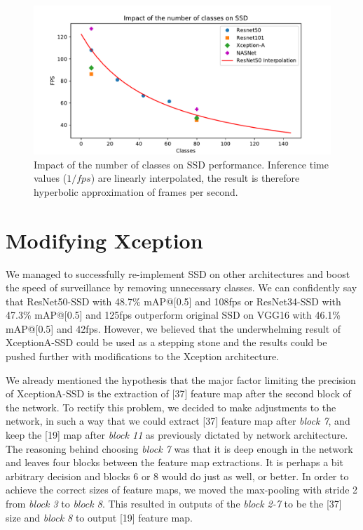 \begin{figure}
    \centering
    \includegraphics[width=\textwidth]{img/fps_cls}
    \caption[Impact of the number of classes on SSD performance]{Impact of the number of classes on SSD performance. Inference time values ($1/fps$) are linearly interpolated, the result is therefore hyperbolic approximation of frames per second.}
    \label{fig:fpscls}
\end{figure}


\section{Modifying Xception}
\label{sec:fixxception}
We managed to successfully re-implement SSD on other architectures and boost the speed of surveillance by removing unnecessary classes. We can confidently say that ResNet50-SSD with 48.7\% mAP@[0.5] and 108fps or ResNet34-SSD with 47.3\% mAP@[0.5] and 125fps outperform original SSD on VGG16 with 46.1\% mAP@[0.5] and 42fps. However, we believed that the underwhelming result of XceptionA-SSD could be used as a stepping stone and the results could be pushed further with modifications to the Xception architecture. 

We already mentioned the hypothesis that the major factor limiting the precision of XceptionA-SSD is the extraction of [37] feature map after the second block of the network. To rectify this problem, we decided to make adjustments to the network, in such a way that we could extract [37] feature map after \textit{block 7}, and keep the [19] map after \textit{block 11} as previously dictated by network architecture. The reasoning behind choosing \textit{block 7} was that it is deep enough in the network and leaves four blocks between the feature map extractions. It is perhaps a bit arbitrary decision and blocks 6 or 8 would do just as well, or better.  In order to achieve the correct sizes of feature maps, we moved the max-pooling with stride 2 from \textit{block 3} to \textit{block 8}. This resulted in outputs of the \textit{block 2-7} to be the [37] size and \textit{block 8} to output [19] feature map. 

